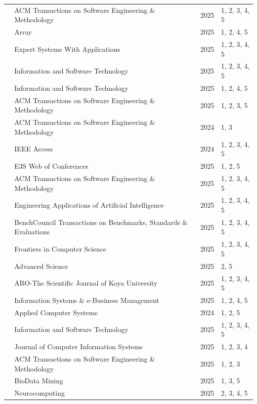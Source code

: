 {\begin{longtable}{p{2.2cm} p{7.6cm} c p{2.6cm}}
\cite{Ahmed:2025ai} & ACM Transactions on Software Engineering \& Methodology & 2025 & 1, 2, 3, 4, 5 \\
\cite{AlHashimi:2025er} & Array & 2025 & 1, 2, 4, 5 \\
\cite{Bai:2025ci} & Expert Systems With Applications & 2025 & 1, 2, 3, 4, 5 \\
\cite{Banh:2025cf} & Information and Software Technology & 2025 & 1, 2, 3, 4, 5 \\
\cite{Basha:2025tt} & Information and Software Technology & 2025 & 1, 2, 4, 5 \\
\cite{Chen:2025es} & ACM Transactions on Software Engineering \& Methodology & 2025 & 1, 2, 3, 5 \\
\cite{Dong:2024sc} & ACM Transactions on Software Engineering \& Methodology & 2024 & 1, 3 \\
\cite{Durrani:2024ad} & IEEE Access & 2024 & 1, 2, 3, 4, 5 \\
\cite{Farhanna:2025eu} & E3S Web of Conferences & 2025 & 1, 2, 5 \\
\cite{Gao:2025cc} & ACM Transactions on Software Engineering \& Methodology & 2025 & 1, 2, 3, 4, 5 \\
\cite{Han:2025mg} & Engineering Applications of Artificial Intelligence & 2025 & 1, 2, 3, 4, 5 \\
\cite{Haque:2025la} & BenchCouncil Transactions on Benchmarks, Standards \& Evaluations & 2025 & 1, 2, 3, 4, 5 \\
\cite{Hemmat:2025rd} & Frontiers in Computer Science & 2025 & 1, 2, 3, 4, 5 \\
\cite{Hou:2025cl} & Advanced Science & 2025 & 2, 5 \\
\cite{Jabrw:2025ss} & ARO-The Scientific Journal of Koya University & 2025 & 1, 2, 3, 4, 5 \\
\cite{Jensen:2025me} & Information Systems \& e-Business Management & 2025 & 1, 2, 4, 5 \\
\cite{KarlovsKarlovskis:2024ga} & Applied Computer Systems & 2024 & 1, 2, 5 \\
\cite{Kim:2025ao} & Information and Software Technology & 2025 & 1, 2, 3, 4, 5 \\
\cite{Kim:2025is} & Journal of Computer Information Systems & 2025 & 1, 2, 3, 4 \\
\cite{Li:2025sc} & ACM Transactions on Software Engineering \& Methodology & 2025 & 1, 2, 3 \\
\cite{Moore:2025vc} & BioData Mining & 2025 & 1, 3, 5 \\
\cite{Pendyala:2025pi} & Neurocomputing & 2025 & 2, 3, 4, 5 \\

\end{longtable}}
